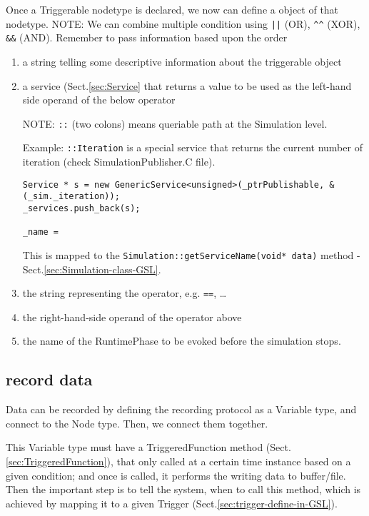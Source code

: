 Once a Triggerable nodetype is declared, we now can define a object of that
nodetype. NOTE: We can combine multiple condition using \verb!||! (OR),
\verb!^^! (XOR), \verb!&&! (AND). Remember to pass information based upon the
order
\begin{enumerate}
  \item a string telling some descriptive information about the triggerable
object 

  \item a service (Sect.\ref{sec:Service} that returns a value to be used as the
  left-hand side operand of the below operator
  
NOTE: \verb!::! (two colons) means queriable path at the Simulation level.

  
Example: \verb!::Iteration! is a special service that returns the current number
of iteration (check SimulationPublisher.C file).
\begin{lstlisting}
Service * s = new GenericService<unsigned>(_ptrPublishable, &(_sim._iteration));
_services.push_back(s);

_name = 
\end{lstlisting}
This is mapped to the \verb!Simulation::getServiceName(void* data)! method
- Sect.\ref{sec:Simulation-class-GSL}.
  
  
  \item the string representing the operator, e.g. \verb!==!, \ldots
  
  \item the right-hand-side operand of the operator above
  
  \item the name of the RuntimePhase to be evoked before the simulation stops.
\end{enumerate}



\subsection{record data}
\label{sec:TriggerFunction-define-in-GSL}

Data can be recorded by defining the recording protocol as a Variable type,
and connect to the Node type. Then, we connect them together.

This Variable type must have a TriggeredFunction method
(Sect.\ref{sec:TriggeredFunction}), that only called at a certain time
instance based on a given condition; and once is called, it performs the writing
data to buffer/file. Then the important step is to tell the system, when to call
this method, which is achieved by mapping it to a given Trigger
(Sect.\ref{sec:trigger-define-in-GSL}).


